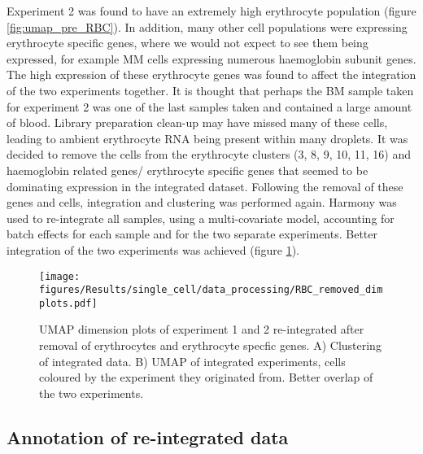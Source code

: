 Experiment 2 was found to have an extremely high erythrocyte population (figure \ref{fig:umap_pre_RBC}).
In addition, many other cell populations were expressing erythrocyte specific genes, where we would not expect to see them being expressed, for example MM cells expressing numerous haemoglobin subunit genes.
The high expression of these erythrocyte genes was found to affect the integration of the two experiments together.
It is thought that perhaps the BM sample taken for experiment 2 was one of the last samples taken and contained a large amount of blood.
Library preparation clean-up may have missed many of these cells, leading to ambient erythrocyte RNA being present within many droplets.
It was decided to remove the cells from the erythrocyte clusters (3, 8, 9, 10, 11, 16) and haemoglobin related genes/ erythrocyte specific genes that seemed to be dominating expression in the integrated dataset.
Following the removal of these genes and cells, integration and clustering was performed again.
Harmony was used to re-integrate all samples, using a multi-covariate model, accounting for batch effects for each sample and for the two separate experiments.
Better integration of the two experiments was achieved (figure \ref{fig:umap_post_RBC}).


\begin{figure}[htb]
    \centering
    \texttt{[image: figures/Results/single\_cell/data\_processing/RBC\_removed\_dimplots.pdf]}
    \caption[Integrated experiments post-erythrocyte removal]{UMAP dimension plots of experiment 1 and 2 re-integrated after removal of erythrocytes and erythrocyte specfic genes.
    A) Clustering of integrated data.
    B) UMAP of integrated experiments, cells coloured by the experiment they originated from.
    Better overlap of the two experiments. }
    \label{fig:umap_post_RBC}
\end{figure}

\subsection{Annotation of re-integrated data}



